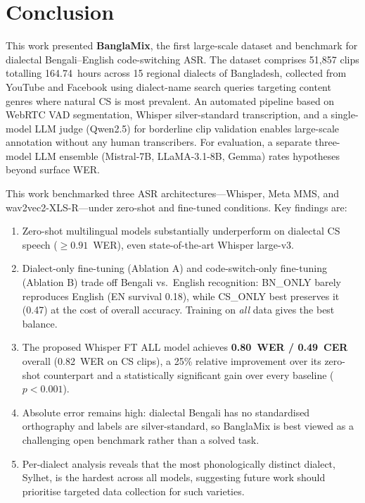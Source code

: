 \section{Conclusion}
\label{sec:conclusion}

This work presented \textbf{BanglaMix}, the first large-scale dataset and
benchmark for dialectal Bengali--English code-switching ASR.
The dataset comprises 51,857 clips totalling 164.74~hours across 15 regional
dialects of Bangladesh, collected from YouTube and Facebook using
dialect-name search queries targeting content genres where natural CS is
most prevalent.
An automated pipeline based on WebRTC VAD segmentation, Whisper
silver-standard transcription, and a single-model LLM judge
(Qwen2.5) for borderline clip validation enables large-scale annotation
without any human transcribers. For evaluation, a separate three-model LLM
ensemble (Mistral-7B, LLaMA-3.1-8B, Gemma) rates hypotheses beyond surface WER.

This work benchmarked three ASR architectures---Whisper, Meta MMS, and
wav2vec2-XLS-R---under zero-shot and fine-tuned conditions.
Key findings are:

\begin{enumerate}[leftmargin=2em, itemsep=2pt]
  \item Zero-shot multilingual models substantially underperform on dialectal CS
        speech ($\geq 0.91$~WER), even state-of-the-art Whisper large-v3.
  \item Dialect-only fine-tuning (Ablation A) and code-switch-only fine-tuning
        (Ablation B) trade off Bengali vs.\ English recognition: BN\_ONLY barely
        reproduces English (EN survival 0.18), while CS\_ONLY best preserves it
        (0.47) at the cost of overall accuracy. Training on \emph{all} data gives
        the best balance.
  \item The proposed Whisper FT ALL model achieves \textbf{0.80~WER /
        0.49~CER} overall (0.82~WER on CS clips), a 25\% relative improvement
        over its zero-shot counterpart and a statistically significant gain over
        every baseline ($p<0.001$).
  \item Absolute error remains high: dialectal Bengali has no standardised
        orthography and labels are silver-standard, so BanglaMix is best viewed
        as a challenging open benchmark rather than a solved task.
  \item Per-dialect analysis reveals that the most phonologically distinct
        dialect, Sylhet, is the hardest across all models, suggesting future
        work should prioritise targeted data collection for such varieties.
\end{enumerate}

